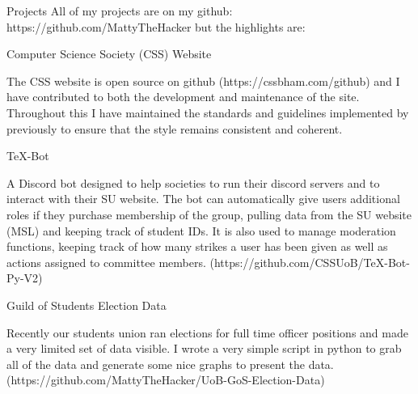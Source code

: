 \documentclass{resume} %
\begin{document}
\begin{rSection}{Projects}
All of my projects are on my github: https://github.com/MattyTheHacker but the highlights are:


\begin{rSubsection}{Computer Science Society (CSS) Website}{}{}

\item The CSS website is open source on github (https://cssbham.com/github) and I have contributed to both the development and maintenance of the site. Throughout this I have maintained the standards and guidelines implemented by previously to ensure that the style remains consistent and coherent. 

\end{rSubsection}

\begin{rSubsection}{TeX-Bot}{}{}

\item A Discord bot designed to help societies to run their discord servers and to interact with their SU website. The bot can automatically give users additional roles if they purchase membership of the group, pulling data from the SU website (MSL) and keeping track of student IDs. It is also used to manage moderation functions, keeping track of how many strikes a user has been given as well as actions assigned to committee members. (https://github.com/CSSUoB/TeX-Bot-Py-V2)

\end{rSubsection}

\begin{rSubsection}{Guild of Students Election Data}{}{}

\item Recently our students union ran elections for full time officer positions and made a very limited set of data visible. I wrote a very simple script in python to grab all of the data and generate some nice graphs to present the data. (https://github.com/MattyTheHacker/UoB-GoS-Election-Data) 

\end{rSubsection}

\end{rSection}



\end{document}
